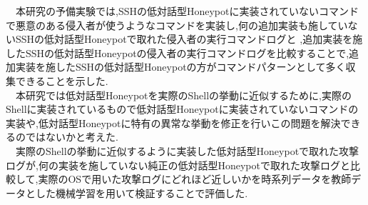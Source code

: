 \ \ 本研究の予備実験では,SSHの低対話型Honeypotに実装されていないコマンドで悪意のある侵入者が使うようなコマンドを実装し,何の追加実装も施していないSSHの低対話型Honeypotで取れた侵入者の実行コマンドログと ,追加実装を施したSSHの低対話型Honeypotの侵入者の実行コマンドログを比較することで,追加実装を施したSSHの低対話型Honeypotの方がコマンドパターンとして多く収集できることを示した.\\
\ \ 本研究では低対話型Honeypotを実際のShellの挙動に近似するために,実際のShellに実装されているもので低対話型Honeypotに実装されていないコマンドの実装や,低対話型Honeypotに特有の異常な挙動を修正を行いこの問題を解決できるのではないかと考えた.\\
\ \ 実際のShellの挙動に近似するように実装した低対話型Honeypotで取れた攻撃ログが,何の実装を施していない純正の低対話型Honeypotで取れた攻撃ログと比較して,実際のOSで用いた攻撃ログにどれほど近しいかを時系列データを教師データとした機械学習を用いて検証することで評価した.








